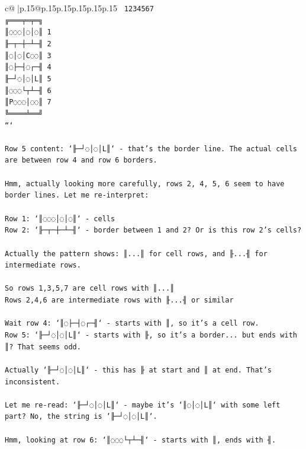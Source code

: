 \documentclass{article}
\begin{document}
{\begin{supertabular}{c@{$\;$}|p{.15\linewidth}@{}p{.15\linewidth}p{.15\linewidth}p{.15\linewidth}p{.15\linewidth}p{.15\linewidth}}
{{{\texttt{ 1234567} \\
\texttt{╔═══╤═╤═╗} \\
\texttt{║◌◌◌│◌│◌║ 1} \\
\texttt{╟─┬─┼─┴─╢ 2} \\
\texttt{║◌│◌│C◌◌║ 3} \\
\texttt{║◌├─┤◌┌─╢ 4} \\
\texttt{╟─┘◌│◌│L║ 5} \\
\texttt{║◌◌◌└┬┴─╢ 6} \\
\texttt{║P◌◌◌│◌◌║ 7} \\
\texttt{╚════╧══╝} \\
\texttt{```} \\
\\ 
\texttt{Row 5 content: `╟─┘◌│◌│L║` {-} that's the border line. The actual cells are between row 4 and row 6 borders.} \\
\\ 
\texttt{Hmm, actually looking more carefully, rows 2, 4, 5, 6 seem to have border lines. Let me re{-}interpret:} \\
\\ 
\texttt{Row 1: `║◌◌◌│◌│◌║` {-} cells} \\
\texttt{Row 2: `╟─┬─┼─┴─╢` {-} border between 1 and 2? Or is this row 2's cells?} \\
\\ 
\texttt{Actually the pattern shows: ║...║ for cell rows, and ╟...╢ for intermediate rows.} \\
\\ 
\texttt{So rows 1,3,5,7 are cell rows with ║...║} \\
\texttt{Rows 2,4,6 are intermediate rows with ╟...╢ or similar} \\
\\ 
\texttt{Wait row 4: `║◌├─┤◌┌─╢` {-} starts with ║, so it's a cell row.} \\
\texttt{Row 5: `╟─┘◌│◌│L║` {-} starts with ╟, so it's a border... but ends with ║? That seems odd.} \\
\\ 
\texttt{Actually `╟─┘◌│◌│L║` {-} this has ╟ at start and ║ at end. That's inconsistent.} \\
\\ 
\texttt{Let me re{-}read: `╟─┘◌│◌│L║` {-} maybe it's `║◌│◌│L║` with some left part? No, the string is `╟─┘◌│◌│L║`.} \\
\\ 
\texttt{Hmm, looking at row 6: `║◌◌◌└┬┴─╢` {-} starts with ║, ends with ╢.} \\
}}}
\end{supertabular}}
\end{document}
